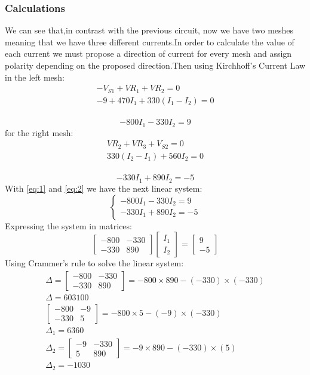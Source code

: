 \documentclass[a4paper]{article}
\begin{document}
\subsubsection{Calculations}
\justify
We can see that,in contrast with the previous circuit, now we have two meshes meaning that we have three different currents.In order to calculate the value of each current we must propose a direction of current for every mesh and assign polarity depending on the proposed direction.Then using Kirchhoff's Current Law in the left mesh:
\begin{gather*}
    -V_{S1}+VR_1+VR_2=0\\
    -9+470I_1+330(I_1-I_2)=0
\end{gather*}\\[-5ex]
\begin{equation}-800I_1-330I_2=9\label{eq:1}\end{equation}
for the right mesh:
\begin{gather*}
    VR_2+VR_3+V_{S2}=0\\
    330(I_2-I_1)+560I_2=0
\end{gather*}\\[-5ex]
\begin{equation}-330I_1+890I_2=-5\label{eq:2}\end{equation}
With \eqref{eq:1} and  \eqref{eq:2} we have the next linear system:
\[
    \begin{cases}
        -800I_1-330I_2=9\\
        -330I_1+890I_2=-5
    \end{cases}
\]
Expressing the system in matrices:
\[
    \begin{bmatrix}
        -800 & -330\\
        -330 & 890
    \end{bmatrix}
    \begin{bmatrix}
        I_1\\
        I_2
    \end{bmatrix}
    =
    \begin{bmatrix}
        9\\
        -5
    \end{bmatrix}
\]
Using Crammer's rule to solve the linear system:
\begin{gather*}
    \Delta=
    \begin{bmatrix}
        -800 & -330\\
        -330 & 890
    \end{bmatrix}
    =-800\times 890-(-330)\times(-330)\\
\Delta=603100\\
    \begin{bmatrix}
        -800 & -9\\
        -330 & 5
    \end{bmatrix}
    =-800\times 5-(-9)\times(-330)\\
    \Delta_1=6360\\
\Delta_2=
    \begin{bmatrix}
        -9 & -330\\
        5 & 890
    \end{bmatrix}
    =-9\times890-(-330)\times(5)\\
    \Delta_2=-1030
\end{gather*}
\end{document}

